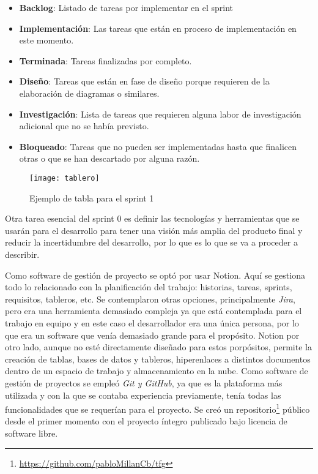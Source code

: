 \begin{itemize}
    \item \textbf{Backlog}: Listado de tareas por implementar en el sprint
    \item \textbf{Implementación}: Las tareas que están en proceso de implementación en este momento.
    \item \textbf{Terminada}: Tareas finalizadas por completo.
    \item \textbf{Diseño}: Tareas que están en fase de diseño porque requieren de la elaboración de diagramas o similares.
    \item \textbf{Investigación}: Lista de tareas que requieren alguna labor de investigación adicional que no se había previsto.
    \item \textbf{Bloqueado}: Tareas que no pueden ser implementadas hasta que finalicen otras o que se han descartado por alguna razón.
\end{itemize}

\begin{figure}[h]
    \centering
    \texttt{[image: tablero]}
    \caption[Tabla de sprint]{Ejemplo de tabla para el sprint 1}
\end{figure}

Otra tarea esencial del sprint 0 es definir las tecnologías y herramientas que se usarán para el desarrollo para tener una visión más amplia del producto final y reducir la incertidumbre del desarrollo, por lo que es lo que se va a proceder a describir.

Como software de gestión de proyecto se optó por usar Notion\cite{notion}. Aquí se gestiona todo lo relacionado con la planificación del trabajo: historias, tareas, sprints, requisitos, tableros, etc. Se contemplaron otras opciones, principalmente \textit{Jira}\cite{jira}, pero era una herramienta demasiado compleja ya que está contemplada para el trabajo en equipo y en este caso el desarrollador era una única persona, por lo que era un software que venía demasiado grande para el propósito. Notion por otro lado, aunque no esté directamente diseñado para estos porpósitos, permite la creación de tablas, bases de datos y tableros, hiperenlaces a distintos documentos dentro de un espacio de trabajo y almacenamiento en la nube. Como software de gestión de proyectos se empleó \textit{Git y GitHub}, ya que es la plataforma más utilizada y con la que se contaba experiencia previamente, tenía todas las funcionalidades que se requerían para el proyecto. Se creó un repositorio\footnote{\url{https://github.com/pabloMillanCb/tfg}} público desde el primer momento con el proyecto íntegro publicado bajo licencia de software libre.

